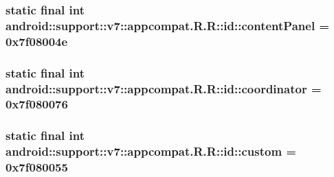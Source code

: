 \hypertarget{classandroid_1_1support_1_1v7_1_1appcompat_1_1_r_1_1id_b02d3d822dc4bd2b04be3a5e76ac8a4f}{
\subsubsection[{contentPanel}]{\setlength{\rightskip}{0pt plus 5cm}static final int android::support::v7::appcompat.R.R::id::contentPanel = 0x7f08004e}}
\label{classandroid_1_1support_1_1v7_1_1appcompat_1_1_r_1_1id_b02d3d822dc4bd2b04be3a5e76ac8a4f}


\hypertarget{classandroid_1_1support_1_1v7_1_1appcompat_1_1_r_1_1id_69422d6b901aca3e7a28b5e102ee599d}{
\subsubsection[{coordinator}]{\setlength{\rightskip}{0pt plus 5cm}static final int android::support::v7::appcompat.R.R::id::coordinator = 0x7f080076}}
\label{classandroid_1_1support_1_1v7_1_1appcompat_1_1_r_1_1id_69422d6b901aca3e7a28b5e102ee599d}


\hypertarget{classandroid_1_1support_1_1v7_1_1appcompat_1_1_r_1_1id_31e86b6e886f68adfa7a8ca0a838de7b}{
\subsubsection[{custom}]{\setlength{\rightskip}{0pt plus 5cm}static final int android::support::v7::appcompat.R.R::id::custom = 0x7f080055}}
\label{classandroid_1_1support_1_1v7_1_1appcompat_1_1_r_1_1id_31e86b6e886f68adfa7a8ca0a838de7b}


